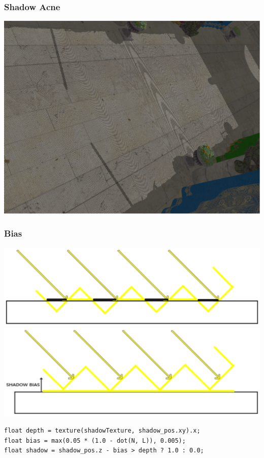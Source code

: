 \begin{frame}\frametitle{Shadow Acne}
  \includegraphics[width=\textwidth]{pics/shadows/shadowMapping/acne.eps}
\end{frame}

\begin{frame}[fragile]\frametitle{Bias}\scriptsize
  \includegraphics[width=.5\textwidth]{pics/shadows/shadowMapping/acne_before.eps}
  \includegraphics[width=.5\textwidth]{pics/shadows/shadowMapping/acne_after.eps}
  \vfill

\begin{verbatim}
float depth = texture(shadowTexture, shadow_pos.xy).x;
float bias = max(0.05 * (1.0 - dot(N, L)), 0.005);
float shadow = shadow_pos.z - bias > depth ? 1.0 : 0.0; 
\end{verbatim}
\end{frame}

